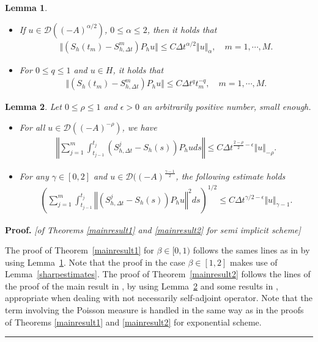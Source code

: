 \documentclass[review,12pt]{elsarticle}
\newtheorem{lemma}{Lemma}[section]
\newenvironment{proof}[1][Proof]{\textbf{#1.} }{\hspace{\stretch{1}}\rule{0.5em}{0.5em}}
\newcommand{\thmref}[1]{{Theorem~\ref{#1}}}
\newcommand{\lemref}[1]{{Lemma~\ref{#1}}}
\begin{document}
\begin{lemma}\cite{Antjd2}
\label{lemnonadditif1}
\begin{itemize}
\item[(i)] If $u\in\mathcal{D}((-A)^{\alpha/2})$, $0\leq \alpha\leq 2$, then it holds that
\begin{eqnarray}
\Vert\left(S_h(t_m)-S^m_{h,\Delta t}\right)P_hu\Vert\leq C\Delta t^{\alpha/2}\Vert u\Vert_{\alpha},\quad m=1,\cdots, M.
\end{eqnarray}
\item[(ii)] For $0\leq q\leq 1$ and $u\in H$, it holds that
\begin{eqnarray}
\Vert \left(S_h(t_m)-S^m_{h,\Delta t}\right)P_hu\Vert\leq C\Delta t^qt_m^{-q},\quad m=1,\cdots, M.
\end{eqnarray}
\end{itemize}
\end{lemma}
\begin{lemma}\cite{Antjd2}
\label{lemnonadditif2}
Let $0\leq \rho\leq 1$ and $\epsilon>0$ an arbitrarily positive number, small enough.
\begin{itemize}
\item[(i)] For all $u\in\mathcal{D}((-A)^{-\rho})$, we have 
\begin{eqnarray}
\left\Vert\sum_{j=1}^m\int_{t_{j-1}}^{t_j}\left(S^j_{h,\Delta t}-S_h(s)\right)P_huds\right\Vert\leq C\Delta t^{\frac{2-\rho}{2}-\epsilon}\Vert u\Vert_{-\rho}.
\end{eqnarray}
\item[(ii)] For any $\gamma\in[0, 2]$ and $u\in\mathcal{D}((-A)^{\frac{\gamma-1}{2}}$, the following estimate holds
\begin{eqnarray}
\left(\sum_{j=1}^m\int_{t_{j-1}}^{t_j}\left\Vert\left(S^j_{h, \Delta t}-S_h(s)\right)P_hu\right\Vert^2ds\right)^{1/2}\leq C\Delta t^{\gamma/2-\epsilon}\Vert u\Vert_{\gamma-1}.
\end{eqnarray}
\end{itemize}
\end{lemma}
\begin{proof}
\textit{[of Theorems \ref{mainresult1} and \ref{mainresult2} for semi  implicit scheme]}

The proof of \thmref{mainresult1} for $\beta\in[0,1)$ follows the sames lines as in \cite[Theorem 6.1]{Yang} by using \lemref{lemnonadditif1}. Note that the proof in the case $\beta\in[1,2]$ makes use of \lemref{sharpestimates}. 
The proof of \thmref{mainresult2} follows the lines of the proof of the main result in \cite{Xiaojie2}, by using \lemref{lemnonadditif2} and some results in \cite{Antjd2}, appropriate when dealing with not necessarily self-adjoint operator. 
Note that the term involving the Poisson measure is handled  in the same way as in the proofs of Theorems  \ref{mainresult1} and \ref{mainresult2} for exponential scheme.
\end{proof}
\end{document}
